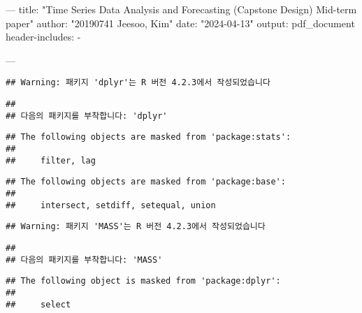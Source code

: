 \documentclass{article}
\begin{document}
---
title: "Time Series Data Analysis and Forecasting (Capstone Design) Mid-term paper"
author: "20190741 Jeesoo, Kim"
date: "2024-04-13"
output: pdf_document
header-includes:
    - \usepackage[utf8]{inputenc}
---

\begin{Shaded}
\begin{Highlighting}[]
\end{Highlighting}
\end{Shaded}

\begin{verbatim}
## Warning: 패키지 'dplyr'는 R 버전 4.2.3에서 작성되었습니다
\end{verbatim}

\begin{verbatim}
## 
## 다음의 패키지를 부착합니다: 'dplyr'
\end{verbatim}

\begin{verbatim}
## The following objects are masked from 'package:stats':
## 
##     filter, lag
\end{verbatim}

\begin{verbatim}
## The following objects are masked from 'package:base':
## 
##     intersect, setdiff, setequal, union
\end{verbatim}

\begin{Shaded}
\begin{Highlighting}[]
\end{Highlighting}
\end{Shaded}

\begin{verbatim}
## Warning: 패키지 'MASS'는 R 버전 4.2.3에서 작성되었습니다
\end{verbatim}

\begin{verbatim}
## 
## 다음의 패키지를 부착합니다: 'MASS'
\end{verbatim}

\begin{verbatim}
## The following object is masked from 'package:dplyr':
## 
##     select
\end{verbatim}

\begin{Shaded}
\begin{Highlighting}[]
\end{Highlighting}
\end{Shaded}
\end{document}
